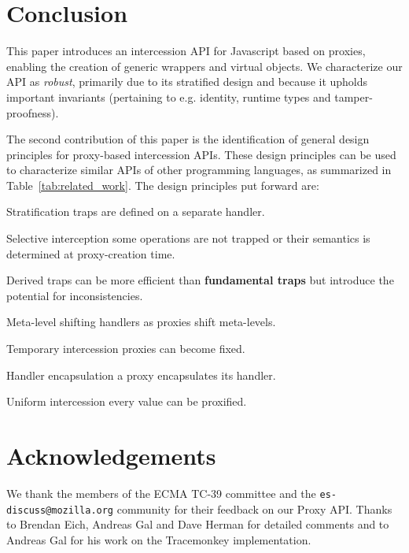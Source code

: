 \documentclass{sig-alternate}
\begin{document}

\section{Conclusion}

This paper introduces an intercession API for Javascript based on proxies, enabling the creation of generic wrappers and virtual objects. We characterize our API as \emph{robust}, primarily due to its stratified design and because it upholds important invariants (pertaining to e.g. identity, runtime types and tamper-proofness).

The second contribution of this paper is the identification of general design principles for proxy-based intercession APIs. These design principles can be used to characterize similar APIs of other programming languages, as summarized in Table~\ref{tab:related_work}. The design principles put forward are:

\begin{description*}
  \item[Stratification] traps are defined on a separate handler.
  \item[Selective interception] some operations are not trapped or their semantics is determined at proxy-creation time.
  \item[Derived traps] can be more efficient than \textbf{fundamental traps} but introduce the potential for inconsistencies.
  \item[Meta-level shifting] handlers as proxies shift meta-levels.
  \item[Temporary intercession] proxies can become fixed.
  \item[Handler encapsulation] a proxy encapsulates its handler.
  \item[Uniform intercession] every value can be proxified.
\end{description*}

\section*{Acknowledgements}

We thank the members of the ECMA TC-39 committee and the \texttt{es-discuss@mozilla.org} community for their feedback on our Proxy API. Thanks to Brendan Eich, Andreas Gal and Dave Herman for detailed comments and to Andreas Gal for his work on the Tracemonkey implementation.



\end{document}
